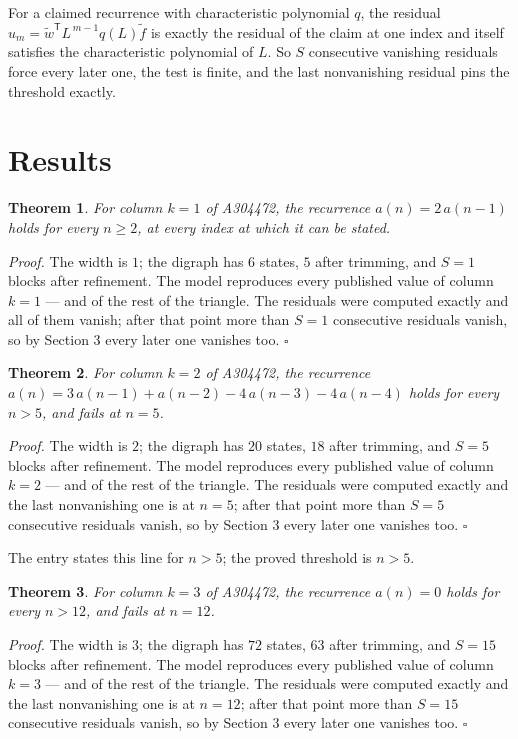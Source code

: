\documentclass[11pt]{article}
\newtheorem{theorem}{Theorem}
\theoremstyle{definition}
\begin{document}
For a claimed recurrence with characteristic polynomial $q$, the residual $u_m = \tilde w^{\mathsf T}L^{\,m-1}q(L)\tilde f$ is exactly the residual of the claim at one index and itself satisfies the characteristic polynomial of $L$. So $S$ consecutive vanishing residuals force every later one, the test is finite, and the last nonvanishing residual pins the threshold exactly.

\section{Results}

\begin{theorem} For column $k = 1$ of A304472, the recurrence $a(n) = 2\,a(n-1)$ holds for every $n \ge 2$, at every index at which it can be stated.\end{theorem}

{\itshape Proof.} The width is $1$; the digraph has $6$ states, $5$ after trimming, and $S = 1$ blocks after refinement. The model reproduces every published value of column $k = 1$ --- and of the rest of the triangle. The residuals were computed exactly and all of them vanish; after that point more than $S = 1$ consecutive residuals vanish, so by Section 3 every later one vanishes too. $\square$

\begin{theorem} For column $k = 2$ of A304472, the recurrence $a(n) = 3\,a(n-1) + a(n-2) - 4\,a(n-3) - 4\,a(n-4)$ holds for every $n > 5$, and fails at $n = 5$.\end{theorem}

{\itshape Proof.} The width is $2$; the digraph has $20$ states, $18$ after trimming, and $S = 5$ blocks after refinement. The model reproduces every published value of column $k = 2$ --- and of the rest of the triangle. The residuals were computed exactly and the last nonvanishing one is at $n = 5$; after that point more than $S = 5$ consecutive residuals vanish, so by Section 3 every later one vanishes too. $\square$

The entry states this line for $n > 5$; the proved threshold is $n > 5$.

\begin{theorem} For column $k = 3$ of A304472, the recurrence $a(n) = 0$ holds for every $n > 12$, and fails at $n = 12$.\end{theorem}

{\itshape Proof.} The width is $3$; the digraph has $72$ states, $63$ after trimming, and $S = 15$ blocks after refinement. The model reproduces every published value of column $k = 3$ --- and of the rest of the triangle. The residuals were computed exactly and the last nonvanishing one is at $n = 12$; after that point more than $S = 15$ consecutive residuals vanish, so by Section 3 every later one vanishes too. $\square$
\end{document}
